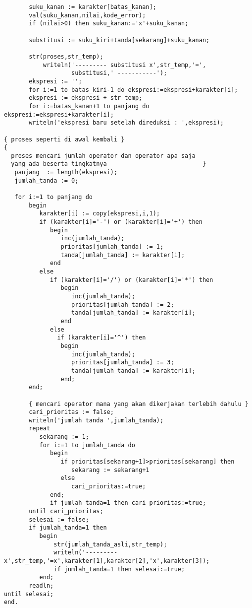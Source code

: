 \documentclass[a4paper,10pt,makeidx]{article}
\begin{document}
\begin{verbatim}
       suku_kanan := karakter[batas_kanan];
       val(suku_kanan,nilai,kode_error);
       if (nilai>0) then suku_kanan:='x'+suku_kanan;

       substitusi := suku_kiri+tanda[sekarang]+suku_kanan;

       str(proses,str_temp);
           writeln('--------- substitusi x',str_temp,'=',
                   substitusi,' -----------');
       ekspresi := '';
       for i:=1 to batas_kiri-1 do ekspresi:=ekspresi+karakter[i];
       ekspresi := ekspresi + str_temp;
       for i:=batas_kanan+1 to panjang do ekspresi:=ekspresi+karakter[i];
       writeln('ekspresi baru setelah direduksi : ',ekspresi);

{ proses seperti di awal kembali }
{
  proses mencari jumlah operator dan operator apa saja
  yang ada beserta tingkatnya                           }
   panjang  := length(ekspresi);
   jumlah_tanda := 0;

   for i:=1 to panjang do
       begin
          karakter[i] := copy(ekspresi,i,1);
          if (karakter[i]='-') or (karakter[i]='+') then
             begin
                inc(jumlah_tanda);
                prioritas[jumlah_tanda] := 1;
                tanda[jumlah_tanda] := karakter[i];
             end
          else
             if (karakter[i]='/') or (karakter[i]='*') then
                begin
                   inc(jumlah_tanda);
                   prioritas[jumlah_tanda] := 2;
                   tanda[jumlah_tanda] := karakter[i];
                end
             else
               if (karakter[i]='^') then
                begin
                   inc(jumlah_tanda);
                   prioritas[jumlah_tanda] := 3;
                   tanda[jumlah_tanda] := karakter[i];
                end;
       end;

       { mencari operator mana yang akan dikerjakan terlebih dahulu }
       cari_prioritas := false;
       writeln('jumlah tanda ',jumlah_tanda);
       repeat
          sekarang := 1;
          for i:=1 to jumlah_tanda do
             begin
                if prioritas[sekarang+1]>prioritas[sekarang] then
                   sekarang := sekarang+1
                else
                   cari_prioritas:=true;
             end;
             if jumlah_tanda=1 then cari_prioritas:=true;
       until cari_prioritas;
       selesai := false;
       if jumlah_tanda=1 then
          begin
              str(jumlah_tanda_asli,str_temp);
              writeln('--------- x',str_temp,'=x',karakter[1],karakter[2],'x',karakter[3]);
              if jumlah_tanda=1 then selesai:=true;
          end;
       readln;
until selesai;
end.
\end{verbatim}
\end{document}
